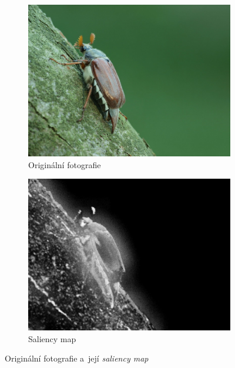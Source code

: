 \begin{figure}[H]
    \centering
    \begin{subfigure}{0.5\textwidth}
      \centering
      \includegraphics[scale=1.0]{obrazky/ORIGbrouk.JPG}
      \caption{Originální fotografie}
      \label{obr:original}
    \end{subfigure}
    \begin{subfigure}{.49\textwidth}
      \centering
      \includegraphics[scale=1.0]{obrazky/StentifordSMbrouk.jpg}
      \caption{Saliency map}
      \label{obr:saliency}
    \end{subfigure}
    \caption{Originální fotografie a~její \emph{saliency map} \cite{Stentiford2007}}
\label{obr:StentSalMap}
\end{figure}

